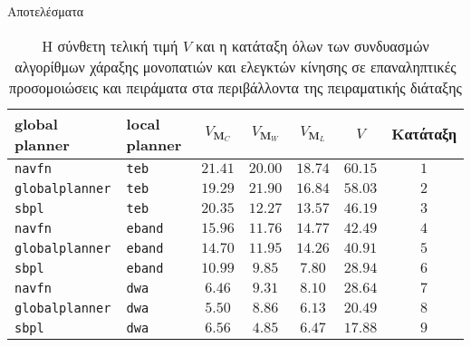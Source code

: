 \begin{frame}{Αποτελέσματα}

  \footnotesize
\begin{table}\centering
\begin{tabular}{llccccc}
  global planner          & local planner   & $V_{\bm{M}_C}$ & $V_{\bm{M}_W}$ & $V_{\bm{M}_L}$ & $V$      & Κατάταξη \\ \toprule
  \texttt{navfn}          & \texttt{teb}    & $21.41$        & $20.00$        & $18.74$        & $60.15$  & $1$      \\
  \texttt{globalplanner}  & \texttt{teb}    & $19.29$        & $21.90$        & $16.84$        & $58.03$  & $2$      \\
  \texttt{sbpl}           & \texttt{teb}    & $20.35$        & $12.27$        & $13.57$        & $46.19$  & $3$      \\
  \texttt{navfn}          & \texttt{eband}  & $15.96$        & $11.76$        & $14.77$        & $42.49$  & $4$      \\
  \texttt{globalplanner}  & \texttt{eband}  & $14.70$        & $11.95$        & $14.26$        & $40.91$  & $5$      \\
  \texttt{sbpl}           & \texttt{eband}  & $10.99$        & $9.85$         & $7.80$         & $28.94$  & $6$      \\
  \texttt{navfn}          & \texttt{dwa}    & $6.46$         & $9.31$         & $8.10$         & $28.64$  & $7$      \\
  \texttt{globalplanner}  & \texttt{dwa}    & $5.50$         & $8.86$         & $6.13$         & $20.49$  & $8$      \\
  \texttt{sbpl}           & \texttt{dwa}    & $6.56$         & $4.85$         & $6.47$         & $17.88$  & $9$      \\ \bottomrule
\end{tabular}
\caption{\tiny Η σύνθετη τελική τιμή $V$ και η κατάταξη όλων των συνδυασμών
         αλγορίθμων χάραξης μονοπατιών και ελεγκτών κίνησης σε
         επαναληπτικές προσομοιώσεις και πειράματα στα περιβάλλοντα
         της πειραματικής διάταξης}
\end{table}


\end{frame}
